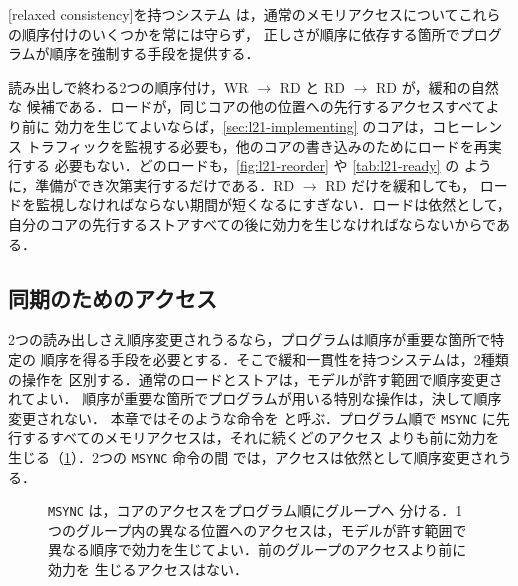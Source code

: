 \documentclass[../main.tex]{subfiles}
\begin{document}
\begin{definition}[緩和一貫性]
  [relaxed consistency]を持つシステム
  は，通常のメモリアクセスについてこれらの順序付けのいくつかを常には守らず，
  正しさが順序に依存する箇所でプログラムが順序を強制する手段を提供する．
\end{definition}

読み出しで終わる2つの順序付け，WR $\to$ RD と RD $\to$ RD が，緩和の自然な
候補である．ロードが，同じコアの他の位置への先行するアクセスすべてより前に
効力を生じてよいならば，\cref{sec:l21-implementing} のコアは，コヒーレンス
トラフィックを監視する必要も，他のコアの書き込みのためにロードを再実行する
必要もない．どのロードも，\cref{fig:l21-reorder} や \cref{tab:l21-ready} の
ように，準備ができ次第実行するだけである．RD $\to$ RD だけを緩和しても，
ロードを監視しなければならない期間が短くなるにすぎない．ロードは依然として，
自分のコアの先行するストアすべての後に効力を生じなければならないからである．

\subsection{同期のためのアクセス}

2つの読み出しさえ順序変更されうるなら，プログラムは順序が重要な箇所で特定の
順序を得る手段を必要とする．そこで緩和一貫性を持つシステムは，2種類の操作を
区別する．通常のロードとストアは，モデルが許す範囲で順序変更されてよい．
順序が重要な箇所でプログラムが用いる特別な操作は，決して順序変更されない．
本章ではそのような命令を  と呼ぶ．プログラム順で
\texttt{MSYNC} に先行するすべてのメモリアクセスは，それに続くどのアクセス
よりも前に効力を生じる（\cref{fig:l21-msync}）．2つの \texttt{MSYNC} 命令の間
では，アクセスは依然として順序変更されうる．

\begin{figure}[htbp]
  \centering
  
  \caption{\texttt{MSYNC} は，コアのアクセスをプログラム順にグループへ
    分ける．1つのグループ内の異なる位置へのアクセスは，モデルが許す範囲で
    異なる順序で効力を生じてよい．前のグループのアクセスより前に効力を
    生じるアクセスはない．}
  \label{fig:l21-msync}
\end{figure}
\end{document}
